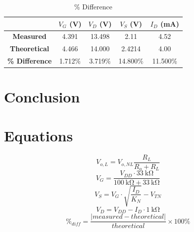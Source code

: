 \begin{table}[hbtp]
  \centering
  \begin{tabular}{ccccc}
    & $V_{G}$ (\si{V}) & $V_{D}$ (\si{V}) & $V_{S}$ (\si{V}) & $I_D$ (\si{mA}) \\
    \hline
    \textbf{Measured} & 4.391 & 13.498 & 2.11 & 4.52 \\
    \textbf{Theoretical} & 4.466 & 14.000 & 2.4214 & 4.00 \\
    \textbf{\% Difference} & 1.712\% & 3.719\% & 14.800\% & 11.500\% \\
  \end{tabular}
  \caption{\label{tab:percent_diff} \% Difference}
\end{table}

\section{Conclusion}
\label{sec:conclusion}


\section{Equations}
\label{sec:equations}

%
\begin{equation}
  \label{eq:amp}
  V_{o,L} = V_{o,NL} \frac{R_L}{R_o + R_L}
\end{equation}
%
\begin{equation}
  \label{eq:V_G}
  V_G = \frac{V_{DD} \cdot \SI{33}{\kilo\ohm}}{\SI{100}{\kilo\ohm} + \SI{33}{\kilo\ohm}}
\end{equation}
%
\begin{equation}
  \label{eq:V_S}
  V_S = V_G \cdot \sqrt{\frac{I_D}{K_N}} - V_{TN}
\end{equation}
%
\begin{equation}
  \label{eq:V_D}
  V_D = V_{DD} - I_D \cdot \SI{1}{\kilo\ohm}
\end{equation}
%
\begin{equation}
  \label{eqn:percent_diff}
  \%_{diff} = \frac{|measured - theoretical|}{theoretical} \times 100\%
\end{equation}



